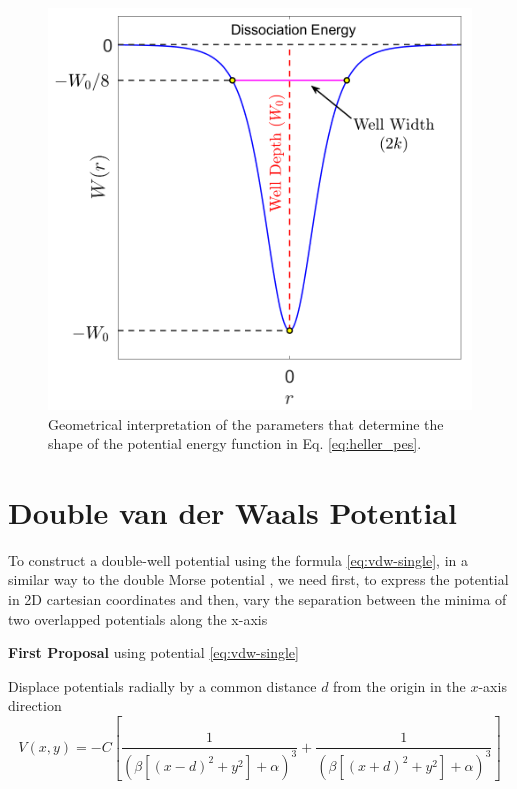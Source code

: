 \documentclass[10pt,aps,onecolumn,superscriptaddress]{revtex4-2}
\begin{document}
\begin{figure}[htbp]
\includegraphics[scale=0.35]{heller_potFunc_new2.png}
\caption{Geometrical interpretation of the parameters that determine the shape of the potential energy function in Eq. \eqref{eq:heller_pes}.}
\label{fig:heller_pes}
\end{figure}





\section{Double van der Waals Potential}

To construct a double-well potential using the formula \eqref{eq:vdw-single}, in a similar way to the double Morse potential \cite{GonzalezMontoya2020}, we need first, to express the potential in 2D cartesian coordinates and then, vary the separation between the minima of two overlapped potentials along the x-axis

\textbf{First Proposal} using potential \eqref{eq:vdw-single}

Displace potentials radially by a common distance $d$ from the origin in the $x$-axis direction
\begin{equation}
    V(x, y) = -C \left[ \dfrac{1}{\left(\beta\left[\left(x - d\right)^2 + y^2\right] + \alpha\right)^3} + \dfrac{1}{\left(\beta\left[\left(x + d\right)^2 + y^2\right] + \alpha\right)^3} \right]
    \label{eq:vdw-double}
\end{equation}
\end{document}

